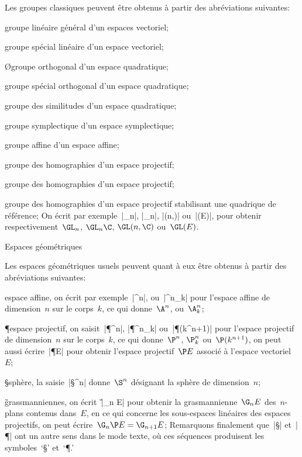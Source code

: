 Les groupes classiques peuvent être obtenus à partir des abréviations
suivantes:
\begincslist
\item\GL groupe linéaire général d'un espaces vectoriel;
\item\SL groupe spécial linéaire d'un espace vectoriel;
\item\O groupe orthogonal d'un espace quadratique;
\item\SO groupe spécial orthogonal d'un espace quadratique;
\item\GO groupe des similitudes d'un espace quadratique;
\item\Sp groupe symplectique d'un espace symplectique;
\item\GA groupe affine d'un espace affine;
\item\PGL groupe des homographies d'un espace projectif;
\item\PSL groupe des homographies d'un espace projectif;
\item\PSO groupe des homographies d'un espace projectif stabilisant
une quadrique de référence;
\endcslist
On écrit par exemple~|\GL_n|, |\GL_n\C|, |\GL(n,\C)| ou~|\GL(E)|, pour obtenir
respectivement~$\GL_n$, $\GL_n\C$, $\GL(n,\C)$ ou~$\GL(E)$.

\formalpar Espaces géométriques

Les espaces géométriques usuels peuvent quant à eux être obtenus à
partir des abréviations suivantes:
\begincslist
\item \A espace affine, on écrit par exemple~|\A^n|, ou~|\A^n_k| pour
      l'espace affine de dimension~$n$ sur le corps~$k$, ce qui
      donne~$\A^n$, ou~$\A^n_k$;
\item \P espace projectif, on saisit~|\P^n|, |\P^n_k| ou~|\P(k^{n+1})|
      pour l'espace projectif de dimension~$n$ sur le corps~$k$, ce
      qui donne~$\P^n$, $\P^n_k$ ou~$\P(k^{n+1})$, on peut aussi
      écrire~|\P E| pour obtenir l'espace projectif~$\P E$ associé à
      l'espace vectoriel~$E$;
\item \S sphère, la saisie~|\S^n| donne~$\S^n$ désignant la sphère de
      dimension~$n$;
\item \G grassmanniennes, on écrit~|\G_n E| pour obtenir la
      grasmannienne~$\G_n E$ des~$n$-plans contenus dans~$E$, en ce
      qui concerne les sous-espaces linéaires des espaces projectifs,
      on peut écrire~$\G_n{\P E} = \G_{n+1} E$;
\endcslist
Remarquons finalement que~|\S| et~|\P| ont un autre sens dans le mode
texte, où ces séquences produisent les symboles~`\S' et~`\P.'


